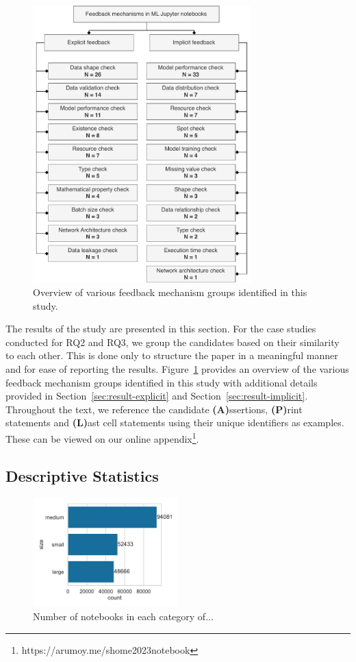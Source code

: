 \documentclass[smallextended]{svjour3}       %
\begin{document}
\begin{figure}
  \centering
  \includegraphics[width=0.75\textwidth]{taxonomy.pdf}
  \caption{Overview of various feedback mechanism groups identified in this study.}
  \label{fig:taxonomy}
\end{figure}

The results of the study are presented in this section. For the case studies conducted for RQ2 and RQ3, we group the candidates based on their similarity to each other. This is done only to structure the paper in a meaningful manner and for ease of reporting the results. Figure~\ref{fig:taxonomy} provides an overview of the various feedback mechanism groups identified in this study with additional details provided in Section~\ref{sec:result-explicit} and Section~\ref{sec:result-implicit}. Throughout the text, we reference the candidate \textbf{(A)}ssertions, \textbf{(P)}rint statements and \textbf{(L)}ast cell statements using their unique identifiers as examples. These can be viewed on our online appendix\footnote{https://arumoy.me/shome2023notebook}.

\subsection{Descriptive Statistics}

\begin{figure}
  \centering
  \includegraphics[width=0.5\textwidth]{notebook-size-distribution.pdf}
  \caption{Number of notebooks in each category of...}
  \label{fig:notebook-size-distribution}
\end{figure}
\end{document}
